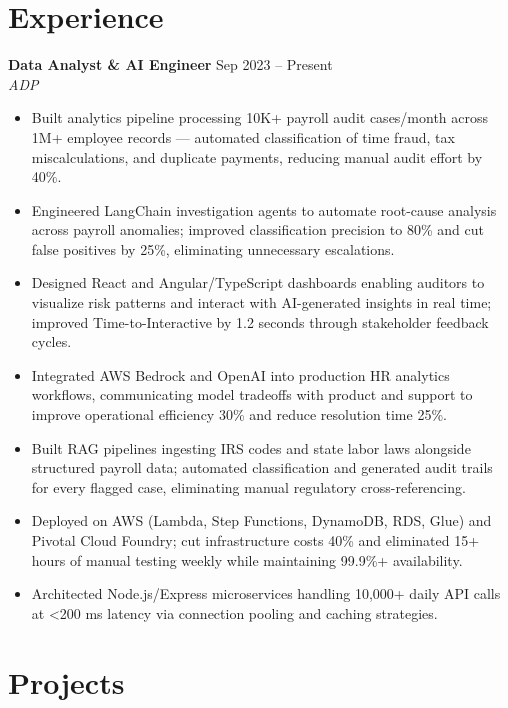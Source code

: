 \documentclass[10pt,letterpaper]{article}
\newcommand{\entry}[3]{%
  \vspace{3pt}\textbf{#1} \hfill #3 \\
  \textit{\small #2}\vspace{1pt}}
\begin{document}
\section{Experience}

\entry{Data Analyst \& AI Engineer}{ADP}{Sep 2023 -- Present}
\begin{itemize}
  \item Built analytics pipeline processing 10K+ payroll audit cases/month across 1M+ employee records --- automated classification of time fraud, tax miscalculations, and duplicate payments, reducing manual audit effort by 40\%.
  \item Engineered LangChain investigation agents to automate root-cause analysis across payroll anomalies; improved classification precision to 80\% and cut false positives by 25\%, eliminating unnecessary escalations.
  \item Designed React and Angular/TypeScript dashboards enabling auditors to visualize risk patterns and interact with AI-generated insights in real time; improved Time-to-Interactive by 1.2 seconds through stakeholder feedback cycles.
  \item Integrated AWS Bedrock and OpenAI into production HR analytics workflows, communicating model tradeoffs with product and support to improve operational efficiency 30\% and reduce resolution time 25\%.
  \item Built RAG pipelines ingesting IRS codes and state labor laws alongside structured payroll data; automated classification and generated audit trails for every flagged case, eliminating manual regulatory cross-referencing.
  \item Deployed on AWS (Lambda, Step Functions, DynamoDB, RDS, Glue) and Pivotal Cloud Foundry; cut infrastructure costs 40\% and eliminated 15+ hours of manual testing weekly while maintaining 99.9\%+ availability.
  \item Architected Node.js/Express microservices handling 10,000+ daily API calls at \textless{}200 ms latency via connection pooling and caching strategies.
\end{itemize}

\section{Projects}
\end{document}
